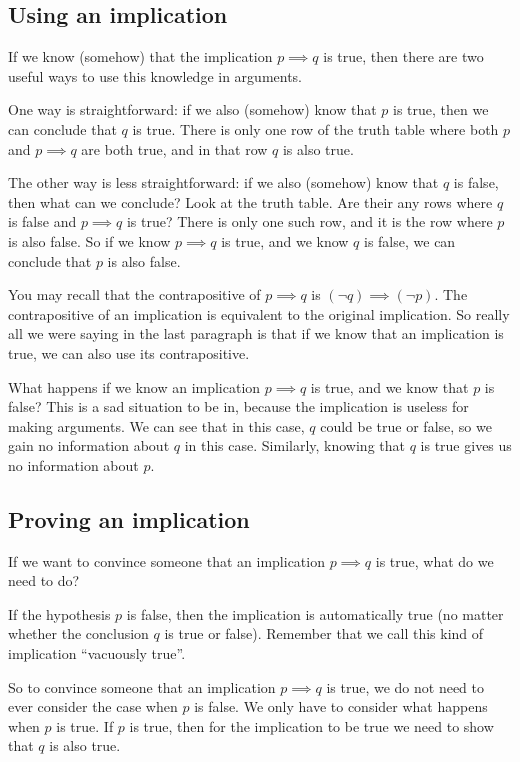 \subsection{Using an implication}

If we know (somehow) that the implication $p \implies q$ is true, then there are two useful ways to use this knowledge in arguments.

One way is straightforward:  if we also (somehow) know that $p$ is true, then we can conclude that $q$ is true.  There is only one row of the truth table where both $p$ and $p \implies q$ are both true, and in that row $q$ is also true.

The other way is less straightforward:  if we also (somehow) know that $q$ is false, then what can we conclude?  Look at the truth table.  Are their any rows where $q$ is false and $p \implies q$ is true?  There is only one such row, and it is the row where $p$ is also false.  So if we know $p \implies q$ is true, and we know $q$ is false,  we can conclude that $p$ is also false. 

You may recall that the contrapositive of $p \implies q$ is $(\neg q) \implies (\neg p)$.  The contrapositive of an implication is equivalent to the original implication.  So really all we were saying in the last paragraph is that if we know that an implication is true, we can also use its contrapositive.

What happens if we know an implication $p \implies q$ is true, and we know that $p$ is false?  This is a sad situation to be in, because the implication is useless for making arguments.  We can see that in this case, $q$ could be true or false, so we gain no information about $q$ in this case.  Similarly, knowing that $q$ is true gives us no information about $p$.

\subsection{Proving an implication}

If we want to convince someone that an implication $p \implies q$ is true, what do we need to do?

If the hypothesis $p$ is false, then the implication is automatically true (no matter whether the conclusion $q$ is true or false).  Remember that we call this kind of implication ``vacuously true''.  

So to convince someone that an implication $p \implies q$ is true, we do not need to ever consider the case when $p$ is false.  We only have to consider what happens when $p$ is true.  If $p$ is true, then for the implication to be true we need to show that $q$ is also true.

